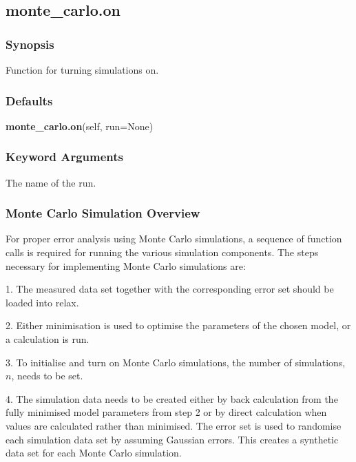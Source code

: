 \newpage

\subsection{monte\_carlo.on}


\subsubsection{Synopsis}

Function for turning simulations on.

\subsubsection{Defaults}

\textsf{\textbf{monte\_carlo.on}(self, run=None)}


\subsubsection{Keyword Arguments}


  The name of the run.


\subsubsection{Monte Carlo Simulation Overview}

For proper error analysis using Monte Carlo simulations, a sequence  of function calls is
required for running the various simulation components.  The steps necessary for
implementing Monte Carlo simulations are:

1.  The measured data set together with the corresponding error set should be loaded into
relax.

2.  Either minimisation  is used to optimise  the parameters of the chosen model, or a
calculation is run.

3.  To initialise and turn on Monte Carlo simulations, the number of simulations, $n$, needs
to be set.

4.  The simulation data needs to be created either by back calculation from the fully
minimised  model parameters from step 2 or by direct calculation when values are calculated
rather than minimised.   The error set is used to randomise each simulation data set by
assuming Gaussian errors.  This creates a synthetic data set for each Monte Carlo
simulation.

